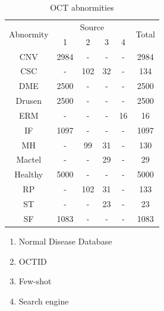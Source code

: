 \documentclass{article}
\begin{document}
	\begin{minipage}[t]{0.4\linewidth}
		{
			\fontsize{9}{12}\selectfont
			{
				\begin{longtable}{cccccc}
					\caption{OCT abnormities}
					\label{tb:OCT_source}\\
					\toprule
					\multirow{2}{*}{Abnormity}&\multicolumn{4}{c}{Source}&\multirow{2}{*}{Total}\\
					&1&2&3&4&\\
					\midrule
					CNV    &2984&-  &- &- &2984\\
					CSC    &-   &102&32&- &134 \\
					DME    &2500&-  &- &- &2500\\
					Drusen &2500&-  &- &- &2500\\
					ERM    &-   &-  &- &16&16  \\
					IF     &1097&-  &- &- &1097\\
					MH     &-   &99 &31&- &130 \\
					Mactel &-   &-  &29&- &29  \\
					Healthy&5000&-  &- &- &5000\\
					RP     &-   &102&31&- &133 \\
					ST     &-   &-  &23&- &23  \\
					SF     &1083&-  &- &- &1083\\
					\bottomrule
				\end{longtable}
				
				\vspace{0.5cm}
				\begin{enumerate}
					\item Normal Disease Database \autocite{Kermany_database}
					\vspace{-0.2cm}
					
					\item OCTID \autocite{Gholami_Roy_Parthasarathy_Lakshminarayanan_2020}
					\vspace{-0.2cm}
					
					\item Few-shot \autocite{Yoo_2020}
					\vspace{-0.2cm}
					
					\item Search engine
					\vspace{-0.2cm}
				\end{enumerate}
				
				\vspace{0.5cm}
			}
		}
	\end{minipage}
\end{document}
